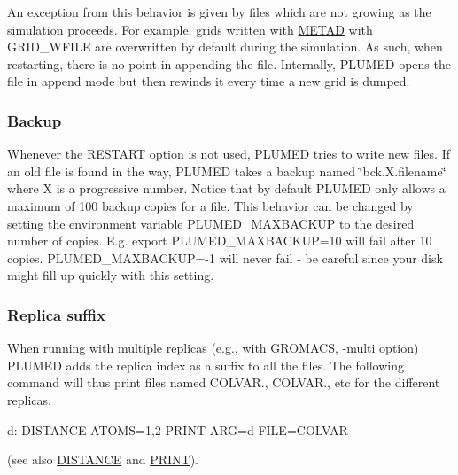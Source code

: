 An exception from this behavior is given by files which are not growing as the simulation proceeds. For example, grids written with \hyperlink{METAD}{M\+E\+T\+A\+D} with G\+R\+I\+D\+\_\+\+W\+F\+I\+L\+E are overwritten by default during the simulation. As such, when restarting, there is no point in appending the file. Internally, P\+L\+U\+M\+E\+D opens the file in append mode but then rewinds it every time a new grid is dumped.\hypertarget{_files_Backup}{}\subsubsection{Backup}\label{_files_Backup}
Whenever the \hyperlink{RESTART}{R\+E\+S\+T\+A\+R\+T} option is not used, P\+L\+U\+M\+E\+D tries to write new files. If an old file is found in the way, P\+L\+U\+M\+E\+D takes a backup named \char`\"{}bck.\+X.\+filename\char`\"{} where X is a progressive number. Notice that by default P\+L\+U\+M\+E\+D only allows a maximum of 100 backup copies for a file. This behavior can be changed by setting the environment variable P\+L\+U\+M\+E\+D\+\_\+\+M\+A\+X\+B\+A\+C\+K\+U\+P to the desired number of copies. E.\+g. export P\+L\+U\+M\+E\+D\+\_\+\+M\+A\+X\+B\+A\+C\+K\+U\+P=10 will fail after 10 copies. P\+L\+U\+M\+E\+D\+\_\+\+M\+A\+X\+B\+A\+C\+K\+U\+P=-\/1 will never fail -\/ be careful since your disk might fill up quickly with this setting.\hypertarget{_files_Replica-Suffix}{}\subsubsection{Replica suffix}\label{_files_Replica-Suffix}
When running with multiple replicas (e.\+g., with G\+R\+O\+M\+A\+C\+S, -\/multi option) P\+L\+U\+M\+E\+D adds the replica index as a suffix to all the files. The following command will thus print files named C\+O\+L\+V\+A\+R., C\+O\+L\+V\+A\+R., etc for the different replicas. \begin{DoxyVerb}d: DISTANCE ATOMS=1,2
PRINT ARG=d FILE=COLVAR
\end{DoxyVerb}
 (see also \hyperlink{DISTANCE}{D\+I\+S\+T\+A\+N\+C\+E} and \hyperlink{PRINT}{P\+R\+I\+N\+T}).

